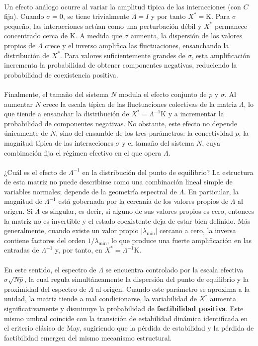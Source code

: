 \\
Un efecto análogo ocurre al variar la amplitud típica de las interacciones (con $C$ fija). Cuando $\sigma=0$, se tiene trivialmente $\Lambda=I$ y por tanto $X^*=\mathrm{K}$. Para $\sigma$ pequeño, las interacciones actúan como una perturbación débil y $X^*$ permanece concentrado cerca de $\mathrm{K}$. A medida que $\sigma$ aumenta, la dispersión de los valores propios de $\Lambda$ crece y el inverso amplifica las fluctuaciones, ensanchando la distribución de $X^*$. Para valores suficientemente grandes de $\sigma$, esta amplificación incrementa la probabilidad de obtener componentes negativas, reduciendo la probabilidad de coexistencia positiva.
\\
\\
Finalmente, el tamaño del sistema $N$ modula el efecto conjunto de $p$ y $\sigma$. Al aumentar $N$ crece la escala típica de las fluctuaciones colectivas de la matriz $\Lambda$, lo que tiende a ensanchar la distribución de $X^*=\Lambda^{-1}\mathrm{K}$ y a incrementar la probabilidad de componentes negativas. No obstante, este efecto no depende únicamente de $N$, sino del ensamble de los tres parámetros: la conectividad $p$, la magnitud típica de las interacciones $\sigma$ y el tamaño del sistema $N$, cuya combinación fija el régimen efectivo en el que opera $\Lambda$.
\\
\\
¿Cuál es el efecto de $\Lambda^{-1}$ en la distribución del punto de equilibrio? La estructura de esta matriz no puede describirse como una combinación lineal simple de variables normales; depende de la geometría espectral de $\Lambda$. En particular, la magnitud de $\Lambda^{-1}$ está gobernada por la cercanía de los valores propios de $\Lambda$ al origen. Si $\Lambda$ es singular, es decir, si alguno de sus valores propios es cero, entonces la matriz no es invertible y el estado coexistente deja de estar bien definido. Más generalmente, cuando existe un valor propio $|\lambda_{\min}|$ cercano a cero, la inversa contiene factores del orden $1/\lambda_{\min}$, lo que produce una fuerte amplificación en las entradas de $\Lambda^{-1}$ y, por tanto, en $X^*=\Lambda^{-1}\mathrm{K}$.
\\
\\
En este sentido, el espectro de $\Lambda$ se encuentra controlado por la escala efectiva $\sigma\sqrt{Np}$, la cual regula simultáneamente la dispersión del punto de equilibrio y la proximidad del espectro de $\Lambda$ al origen. Cuando este parámetro se aproxima a la unidad, la matriz tiende a mal condicionarse, la variabilidad de $X^*$ aumenta significativamente y disminuye la probabilidad de \textbf{factibilidad positiva}. Este mismo umbral coincide con la transición de estabilidad dinámica identificada en el criterio clásico de May, sugiriendo que la pérdida de estabilidad y la pérdida de factibilidad emergen del mismo mecanismo estructural. \\

